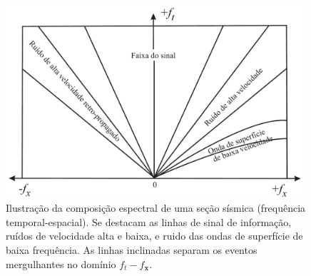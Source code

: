 \begin{figure}[H]
\centering
\includegraphics[width=11cm]{figuras/cap3/Analise_Idealizada_Sinal_Ruido_Frequencia.pdf}
\vspace{-0.3cm}
\caption{Ilustração da composição espectral de uma seção sísmica (frequência temporal-espacial). 
Se destacam as linhas de sinal de informação, ruídos de velocidade alta e baixa, e ruido das ondas de superfície de baixa frequência. As linhas inclinadas separam os eventos mergulhantes no domínio $f_{t}-f_{\mathbf{x}}$.}
\label{fig:Analise_Idealizada_Sinal_Ruido_Frequencia}
\end{figure}

